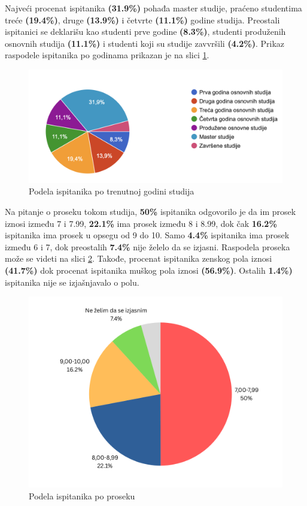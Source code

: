 \documentclass[a4paper]{article}
\begin{document}
Najveći procenat ispitanika \textbf{(31.9\%)} pohađa master studije, praćeno studentima treće \textbf{(19.4\%)}, druge \textbf{(13.9\%)} i četvrte \textbf{(11.1\%)} godine studija. Preostali ispitanici se deklarišu kao studenti prve godine \textbf{(8.3\%)}, studenti produženih osnovnih studija \textbf{(11.1\%)} i studenti koji su studije zavvršili \textbf{(4.2\%)}. Prikaz raspodele ispitanika po godinama prikazan je na slici \ref{fig:raspodela_godine}.

\begin{figure}[H]
    \centering
    \includegraphics[width=0.8\linewidth]{raspodela_godine.png}
    \caption{Podela ispitanika po trenutnoj godini studija}
    \label{fig:raspodela_godine}
\end{figure}


Na pitanje o proseku tokom studija, \textbf{50\%} ispitanika odgovorilo je da im prosek iznosi između 7 i 7.99, \textbf{22.1\%} ima prosek između 8 i 8.99, dok čak \textbf{16.2\%} ispitanika ima prosek u opsegu od 9 do 10. Samo \textbf{4.4\%} ispitanika ima prosek između 6 i 7, dok preostalih \textbf{7.4\%} nije želelo da se izjasni. Raspodela proseka može se videti na slici \ref{fig:raspodela_prosek}. Takođe, procenat ispitanika zenskog pola iznosi  \textbf{(41.7\%)} dok procenat ispitanika muškog pola iznosi \textbf{(56.9\%)}. Ostalih \textbf{1.4\%)} ispitanika nije se izjašnjavalo o polu.

\begin{figure}[H]
    \centering
    \includegraphics[width=0.7\linewidth]{prosek.png}
    \caption{Podela ispitanika po proseku}
    \label{fig:raspodela_prosek}
\end{figure}
\end{document}
